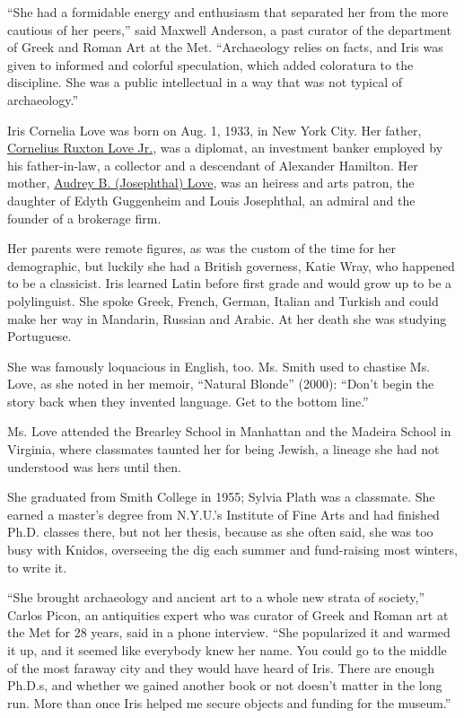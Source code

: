 ``She had a formidable energy and enthusiasm that separated her from the
more cautious of her peers,'' said Maxwell Anderson, a past curator of
the department of Greek and Roman Art at the Met. ``Archaeology relies
on facts, and Iris was given to informed and colorful speculation, which
added coloratura to the discipline. She was a public intellectual in a
way that was not typical of archaeology.''

Iris Cornelia Love was born on Aug. 1, 1933, in New York City. Her
father,
\href{https://www.nytimes.com/1971/09/07/archives/c-ruxton-love-jr-of-stock-exchange.html}{Cornelius
Ruxton Love Jr.}, was a diplomat, an investment banker employed by his
father-in-law, a collector and a descendant of Alexander Hamilton. Her
mother,
\href{https://www.nytimes.com/2003/11/27/nyregion/audrey-b-love-100-a-patron-of-the-arts.html}{Audrey
B. (Josephthal) Love}, was an heiress and arts patron, the daughter of
Edyth Guggenheim and Louis Josephthal, an admiral and the founder of a
brokerage firm.

Her parents were remote figures, as was the custom of the time for her
demographic, but luckily she had a British governess, Katie Wray, who
happened to be a classicist. Iris learned Latin before first grade and
would grow up to be a polylinguist. She spoke Greek, French, German,
Italian and Turkish and could make her way in Mandarin, Russian and
Arabic. At her death she was studying Portuguese.

She was famously loquacious in English, too. Ms. Smith used to chastise
Ms. Love, as she noted in her memoir, ``Natural Blonde'' (2000): ``Don't
begin the story back when they invented language. Get to the bottom
line.''

Ms. Love attended the Brearley School in Manhattan and the Madeira
School in Virginia, where classmates taunted her for being Jewish, a
lineage she had not understood was hers until then.

She graduated from Smith College in 1955; Sylvia Plath was a classmate.
She earned a master's degree from N.Y.U.'s Institute of Fine Arts and
had finished Ph.D. classes there, but not her thesis, because as she
often said, she was too busy with Knidos, overseeing the dig each summer
and fund-raising most winters, to write it.

``She brought archaeology and ancient art to a whole new strata of
society,'' Carlos Picon, an antiquities expert who was curator of Greek
and Roman art at the Met for 28 years, said in a phone interview. ``She
popularized it and warmed it up, and it seemed like everybody knew her
name. You could go to the middle of the most faraway city and they would
have heard of Iris. There are enough Ph.D.s, and whether we gained
another book or not doesn't matter in the long run. More than once Iris
helped me secure objects and funding for the museum.''

